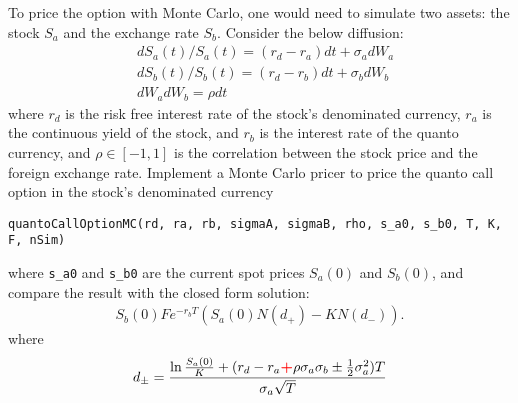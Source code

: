\documentclass[10pt,a4paper,hidelinks,fleqn]{article}            %
\begin{document}
To price the option with Monte Carlo, one would need to simulate two assets: the stock $S_a$ and the exchange rate $S_b$.
Consider the below diffusion:
\begin{align}
& dS_a(t) / S_a(t) = (r_d - r_a) dt + \sigma_a dW_a \\
& dS_b(t) / S_b(t) = (r_d - r_b) dt + \sigma_b dW_b \\
& dW_a dW_b = \rho dt
\end{align}
where $r_d$ is the risk free interest rate of the stock's denominated currency, $r_a$ is the continuous yield of the stock, and $r_b$ is the interest rate of the quanto currency, and $\rho \in [-1, 1]$ is the correlation between the stock price and the foreign exchange rate.
Implement a Monte Carlo pricer to price the quanto call option in the stock's denominated currency
\begin{verbatim}
quantoCallOptionMC(rd, ra, rb, sigmaA, sigmaB, rho, s_a0, s_b0, T, K, F, nSim)
\end{verbatim}
where \verb=s_a0= and \verb=s_b0= are the current spot prices $S_a(0)$ and $S_b(0)$, 
and compare the result with the closed form solution:
\begin{align}
S_b(0) F e^{-r_bT}\left( S_a(0) N(d_+) - K N(d_-)  \right).
\end{align}
where
\begin{align*}
d_{\pm} = \frac{\ln \frac{S_a(0)}{K} + (r_d - r_a \textbf{\textcolor{red}{+}} \rho \sigma_a \sigma_b \pm \frac{1}{2}\sigma_a^2)T}{\sigma_a \sqrt{T}}
\end{align*}
\end{document}
